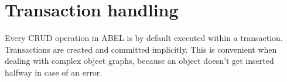 \documentclass[a4paper,12pt]{report}
\begin{document}
%
%
%
%
%
%	
%
%
%
%
%
%
%

\chapter{Transaction handling}

Every CRUD operation in ABEL is by default executed within a transaction. 
Transactions are created and committed implicitly. This is convenient when dealing with complex object graphs, because an object doesn't get inserted halfway in case of an error.
\end{document}
